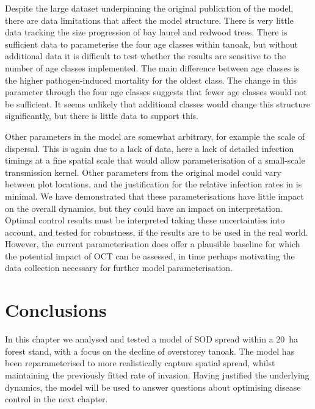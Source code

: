 Despite the large dataset underpinning the original publication of the model, there are data limitations that affect the model structure. There is very little data tracking the size progression of bay laurel and redwood trees. There is sufficient data to parameterise the four age classes within tanoak, but without additional data it is difficult to test whether the results are sensitive to the number of age classes implemented. The main difference between age classes is the higher pathogen-induced mortality for the oldest class. The change in this parameter through the four age classes suggests that fewer age classes would not be sufficient. It seems unlikely that additional classes would change this structure significantly, but there is little data to support this.

Other parameters in the model are somewhat arbitrary, for example the scale of dispersal. This is again due to a lack of data, here a lack of detailed infection timings at a fine spatial scale that would allow parameterisation of a small-scale transmission kernel. Other parameters from the original model could vary between plot locations, and the justification for the relative infection rates in \citet{cobb_ecosystem_2012} is minimal. We have demonstrated that these parameterisations have little impact on the overall dynamics, but they could have an impact on interpretation. Optimal control results must be interpreted taking these uncertainties into account, and tested for robustness, if the results are to be used in the real world. However, the current parameterisation does offer a plausible baseline for which the potential impact of OCT can be assessed, in time perhaps motivating the data collection necessary for further model parameterisation.

\section{Conclusions\label{sec:ch5:conclusions}}

In this chapter we analysed and tested a model of SOD spread within a \SI{20}{\hectare} forest stand, with a focus on the decline of overstorey tanoak. The model has been reparameterised to more realistically capture spatial spread, whilst maintaining the previously fitted rate of invasion. Having justified the underlying dynamics, the model will be used to answer questions about optimising disease control in the next chapter.